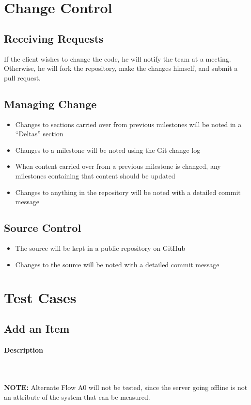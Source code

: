\documentclass{article}
\begin{document}
\section{Change Control}

\subsection{Receiving Requests}
If the client wishes to change the code, he will notify the team at a meeting.  Otherwise, he will fork the repository, make the changes himself, and submit a pull request.

\subsection{Managing Change}
\begin{itemize}
\item Changes to sections carried over from previous milestones will be noted in a ``Deltas'' section
\item Changes to a milestone will be noted using the Git change log
\item When content carried over from a previous milestone is changed, any milestones containing that content should be updated
\item Changes to anything in the repository will be noted with a detailed commit message
\end{itemize}

\subsection{Source Control}
\begin{itemize}
\item The source will be kept in a public repository on GitHub
\item Changes to the source will be noted with a detailed commit message
\end{itemize}

\section{Test Cases}

\subsection{Add an Item}
\paragraph{Description}
~\\ \\
\textbf{NOTE:} Alternate Flow A0 will not be tested, since the server going offline is not an attribute of the system that can be measured.
\end{document}
